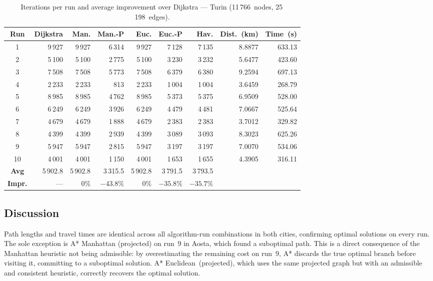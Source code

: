 \documentclass[12pt,a4paper]{article}
\begin{document}
\begin{table}[H]
  \centering
  \small
  \setlength{\tabcolsep}{5pt}
  \begin{tabular}{crrrrrrrr}
    \toprule
    \textbf{Run} & \textbf{Dijkstra} & \textbf{Man.} & \textbf{Man.-P} & \textbf{Euc.} & \textbf{Euc.-P} & \textbf{Hav.} & \textbf{Dist.~(km)} & \textbf{Time~(s)} \\
    \midrule
    1  & 9\,927 & 9\,927 & 6\,314 & 9\,927 & 7\,128 & 7\,135 & 8.8877 & 633.13 \\
    2  & 5\,100 & 5\,100 & 2\,775 & 5\,100 & 3\,230 & 3\,232 & 5.6477 & 423.60 \\
    3  & 7\,508 & 7\,508 & 5\,773 & 7\,508 & 6\,379 & 6\,380 & 9.2594 & 697.13 \\
    4  & 2\,233 & 2\,233 &   813 & 2\,233 & 1\,004 & 1\,004 & 3.6459 & 268.79 \\
    5  & 8\,985 & 8\,985 & 4\,762 & 8\,985 & 5\,373 & 5\,375 & 6.9509 & 528.00 \\
    6  & 6\,249 & 6\,249 & 3\,926 & 6\,249 & 4\,479 & 4\,481 & 7.0667 & 525.64 \\
    7  & 4\,679 & 4\,679 & 1\,888 & 4\,679 & 2\,383 & 2\,383 & 3.7012 & 329.82 \\
    8  & 4\,399 & 4\,399 & 2\,939 & 4\,399 & 3\,089 & 3\,093 & 8.3023 & 625.26 \\
    9  & 5\,947 & 5\,947 & 2\,815 & 5\,947 & 3\,197 & 3\,197 & 7.0070 & 534.06 \\
    10 & 4\,001 & 4\,001 & 1\,150 & 4\,001 & 1\,653 & 1\,655 & 4.3905 & 316.11 \\
    \midrule
    \textbf{Avg}   & 5\,902.8 & 5\,902.8 & 3\,315.5 & 5\,902.8 & 3\,791.5 & 3\,793.5 & & \\
    \textbf{Impr.} & ---      & $0\%$    & $-43.8\%$ & $0\%$   & $-35.8\%$ & $-35.7\%$ & & \\
    \bottomrule
  \end{tabular}
  \caption{Iterations per run and average improvement over Dijkstra --- Turin (11\,766~nodes, 25\,198~edges).}
  \label{tab:results_turin}
\end{table}

\subsection{Discussion}

Path lengths and travel times are identical across all algorithm-run combinations in both cities, confirming optimal solutions on every run.
The sole exception is A* Manhattan (projected) on run~9 in Aosta, which found a suboptimal path.
This is a direct consequence of the Manhattan heuristic not being admissible: by overestimating the remaining cost on run~9, A* discards the true optimal branch before visiting it, committing to a suboptimal solution.
A* Euclidean~(projected), which uses the same projected graph but with an admissible and consistent heuristic, correctly recovers the optimal solution.
\end{document}
